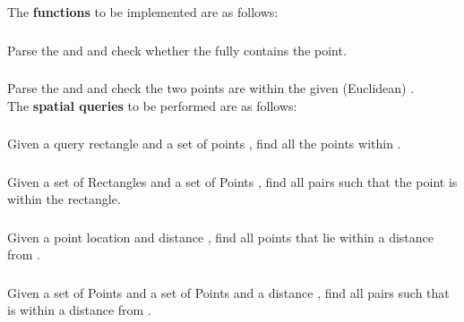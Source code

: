     The \textbf{functions} to be implemented are as follows:

    \subsubsection{}

    Parse the  and  and check whether the  fully contains the point.

    \subsubsection{}
    Parse the  and  and check the two points are within the given (Euclidean) .\\

    The \textbf{spatial queries} to be performed are as follows:

    \subsubsection{}
    Given a query rectangle  and a set of points , find all the points within .

    \subsubsection{}
    Given a set of Rectangles  and a set of Points , find all  pairs such that the point is within the rectangle.

    \subsubsection{}
    Given a point location  and distance , find all points that lie within a distance  from .

    \subsubsection{}
    Given a set of Points  and a set of Points  and a distance , find all  pairs such that  is within a distance  from .

